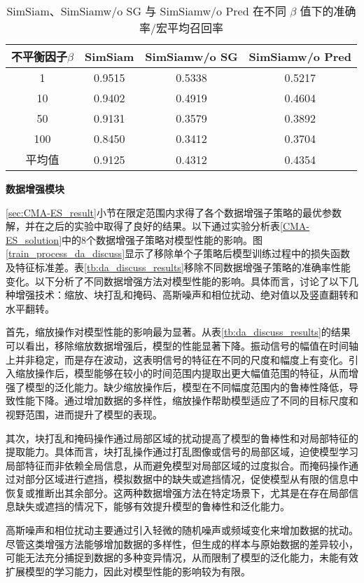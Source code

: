 \documentclass[master]{thesis-uestc}
\begin{document}
\begin{table}
    \caption{SimSiam、SimSiamw/o SG 与 SimSiamw/o Pred 在不同 $\beta$ 值下的准确率/宏平均召回率}
    \centering
    \begin{tabular}{cccc}
    \toprule
    不平衡因子$\beta$  & SimSiam & SimSiamw/o SG & SimSiamw/o Pred \\
    \midrule
    1   & 0.9515  & 0.5338  & 0.5217 \\
    10  & 0.9402  & 0.4919  & 0.4604 \\
    50  & 0.9131  & 0.3579  & 0.3892 \\
    100 & 0.8450  & 0.3412  & 0.3704 \\
    \midrule
    平均值 & 0.9125 & 0.4312 & 0.4354\\
    \bottomrule
    \end{tabular}
    \label{simsiam_vs_simsiamwosg_wopred}
\end{table}

\textbf{数据增强模块}

\ref{sec:CMA-ES_result}小节在限定范围内求得了各个数据增强子策略的最优参数解，并在之后的实验中取得了良好的结果。以下通过实验分析表\ref{CMA-ES_solution}中的8个数据增强子策略对模型性能的影响。图\ref{train_process_da_discuss}显示了移除单个子策略后模型训练过程中的损失函数及特征标准差。表\ref{tb:da_discuss_results}移除不同数据增强子策略的准确率性能变化。以下分析了不同数据增强方法对模型性能的影响。具体而言，讨论了以下几种增强技术：缩放、块打乱和掩码、高斯噪声和相位扰动、绝对值以及竖直翻转和水平翻转。

首先，缩放操作对模型性能的影响最为显著。从表\ref{tb:da_discuss_results}的结果可以看出，移除缩放数据增强后，模型的性能显著下降。振动信号的幅值在时间轴上并非稳定，而是存在波动，这表明信号的特征在不同的尺度和幅度上有变化。引入缩放操作后，模型能够在较小的时间范围内提取出更大幅值范围的特征，从而增强了模型的泛化能力。缺少缩放操作后，模型在不同幅度范围内的鲁棒性降低，导致性能下降。通过增加数据的多样性，缩放操作帮助模型适应了不同的目标尺度和视野范围，进而提升了模型的表现。

其次，块打乱和掩码操作通过局部区域的扰动提高了模型的鲁棒性和对局部特征的提取能力。具体而言，块打乱操作通过打乱图像或信号的局部区域，迫使模型学习局部特征而非依赖全局信息，从而避免模型对局部区域的过度拟合。而掩码操作通过对部分区域进行遮挡，模拟数据中的缺失或遮挡情况，促使模型从有限的信息中恢复或推断出其余部分。这两种数据增强方法在特定场景下，尤其是在存在局部信息缺失或遮挡的情况下，能够有效提升模型的鲁棒性和泛化能力。

高斯噪声和相位扰动主要通过引入轻微的随机噪声或频域变化来增加数据的扰动。尽管这类增强方法能够增加数据的多样性，但生成的样本与原始数据的差异较小，可能无法充分捕捉到数据的多种变异情况，从而限制了模型的泛化能力，未能有效扩展模型的学习能力，因此对模型性能的影响较为有限。
\end{document}
